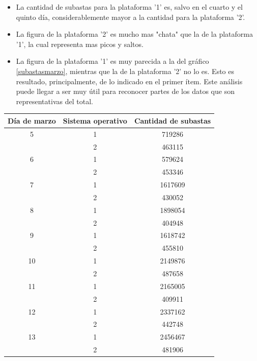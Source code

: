 \documentclass{article}
\begin{document}
	\begin{itemize}
		\item La cantidad de subastas para la plataforma '1' es, salvo en el cuarto y el quinto día, considerablemente mayor a la cantidad para la plataforma '2'.
		\item La figura de la plataforma '2' es mucho mas "chata" que la de la plataforma '1', la cual representa mas picos y saltos.
		\item La figura de la plataforma '1' es muy parecida a la del gráfico \ref{subastasmarzo}, mientras que la de la plataforma '2' no lo es. Esto es resultado, principalmente, de lo indicado en el primer ítem. Este análisis puede llegar a ser muy útil para reconocer partes de los datos que son representativas del total.
	\end{itemize}
	
	\FloatBarrier
	\begin{center}
		\begin{tabular}{ |c|c|c| }
	    	\hline
        	Día de marzo & Sistema operativo & Cantidad de subastas \\
    	    \hline\hline
			5 & 1 & 719286 \\
			  & 2 & 463115 \\
			\hline
			6 & 1 & 579624 \\
			  & 2 & 453346 \\
			\hline
			7 & 1 & 1617609 \\
			  & 2 & 430052 \\
			\hline
			8 & 1 & 1898054 \\
			  & 2 & 404948 \\
			\hline
			9 & 1 & 1618742 \\
			  & 2 & 455810 \\
			\hline
			10 & 1 & 2149876 \\
			  & 2 & 487658 \\
			\hline
			11 & 1 & 2165005 \\
			  & 2 & 409911 \\
			\hline
			12 & 1 & 2337162 \\
			  & 2 & 442748 \\
			\hline
			13 & 1 & 2456467 \\
			  & 2 & 481906 \\
			\hline
		\end{tabular}
	\end{center}
	
\end{document}
